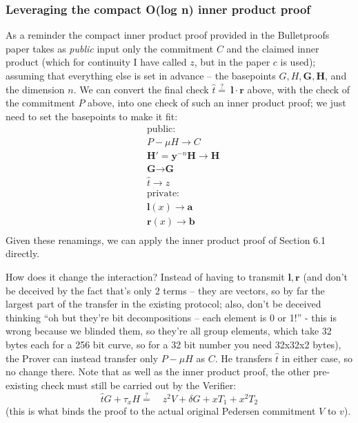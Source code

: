 \documentclass[10pt,a4paper]{article}
\begin{document}
\hypertarget{leveraging-the-compact-ologn-inner-product-proof}{%
\subsubsection[Leveraging the compact O(log n) inner product
proof]{\texorpdfstring{\protect\hypertarget{anchor-57}{}{}Leveraging the
compact O(log n) inner product
proof}{Leveraging the compact O(log n) inner product proof}}\label{leveraging-the-compact-ologn-inner-product-proof}}

As a reminder the compact inner product proof provided in the
Bulletproofs paper takes as \emph{public }input only the commitment $C$ and
the claimed inner product (which for continuity I have called $z$, but in
the paper $c$ is used); assuming that everything else is set in advance --
the basepoints $G, H, \mathbf{G}, \mathbf{H}$, and the dimension $n$. We can convert the final check $\hat{t} \stackrel{?}{=} \ \textbf{l} \cdot \textbf{r}$
above, with the check of the commitment $P$ above, into one check of such an
inner product proof; we just need to set the basepoints to make it fit:
\begin{align*}
& \textrm{public:} \\
& P - \mu H \rightarrow C \\
& \textbf{H}' = \textbf{y}^{-n}\textbf{H} \rightarrow \textbf{H} \\
& \textbf{G} \rightarrow \textbf{G} \\
& \hat{t} \rightarrow z \\
& \textrm{private:} \\
& \textbf{l}(x) \rightarrow \textbf{a} \\
& \textbf{r}(x) \rightarrow \textbf{b} \\
\end{align*}
Given these renamings, we can apply the inner product proof of Section
6.1 directly.

How does it change the interaction? Instead of having to transmit $\mathbf{l}, \mathbf{r}$ (and
don't be deceived by the fact that's only 2 terms -- they are vectors,
so by far the largest part of the transfer in the existing protocol;
also, don't be deceived thinking ``oh but they're bit decompositions --
each element is 0 or 1!'' - this is wrong because we blinded them, so
they're all group elements, which take 32 bytes each for a 256 bit
curve, so for a 32 bit number you need 32x32x2 bytes), the Prover can
instead transfer only $P-\mu H$ as $C$. He transfers $\hat{t}$ in either case, so no change
there. Note that as well as the inner product proof, the other
pre-existing check must still be carried out by the Verifier:
\[\hat{t}G + \tau_x H \stackrel{?}{=} \quad z^2V + \delta G + xT_1 + x^2T_2\]
(this is what binds the proof to the actual original Pedersen commitment $V$
to $v$).
\end{document}
